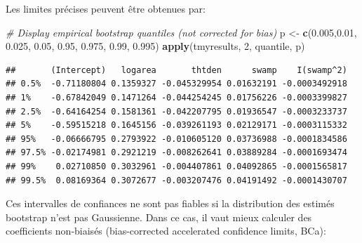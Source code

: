 \documentclass[12pt,]{book}
\newenvironment{Shaded}{\begin{snugshade}}{\end{snugshade}}
\newcommand{\CommentTok}[1]{\textcolor[rgb]{0.56,0.35,0.01}{\textit{#1}}}
\newcommand{\DecValTok}[1]{\textcolor[rgb]{0.00,0.00,0.81}{#1}}
\newcommand{\FloatTok}[1]{\textcolor[rgb]{0.00,0.00,0.81}{#1}}
\newcommand{\KeywordTok}[1]{\textcolor[rgb]{0.13,0.29,0.53}{\textbf{#1}}}
\newcommand{\NormalTok}[1]{#1}
\newcommand{\StringTok}[1]{\textcolor[rgb]{0.31,0.60,0.02}{#1}}
\begin{document}
Les limites précises peuvent être obtenues par:

\begin{Shaded}
\begin{Highlighting}[]
\CommentTok{# Display empirical bootstrap quantiles (not corrected for bias)}
\NormalTok{p <-}\StringTok{ }\KeywordTok{c}\NormalTok{(}\FloatTok{0.005}\NormalTok{,}\FloatTok{0.01}\NormalTok{, }\FloatTok{0.025}\NormalTok{, }\FloatTok{0.05}\NormalTok{, }\FloatTok{0.95}\NormalTok{, }\FloatTok{0.975}\NormalTok{, }\FloatTok{0.99}\NormalTok{, }\FloatTok{0.995}\NormalTok{)}
\KeywordTok{apply}\NormalTok{(tmyresults, }\DecValTok{2}\NormalTok{, quantile, p)}
\end{Highlighting}
\end{Shaded}

\begin{verbatim}
##       (Intercept)   logarea       thtden      swamp    I(swamp^2)
## 0.5%  -0.71180804 0.1359327 -0.045329954 0.01632191 -0.0003492918
## 1%    -0.67842049 0.1471264 -0.044254245 0.01756226 -0.0003399827
## 2.5%  -0.64164254 0.1581361 -0.042207795 0.01936547 -0.0003233737
## 5%    -0.59515218 0.1645156 -0.039261193 0.02129171 -0.0003115332
## 95%   -0.06666795 0.2793922 -0.010605120 0.03736988 -0.0001834586
## 97.5% -0.02174981 0.2921219 -0.008262641 0.03889284 -0.0001693474
## 99%    0.02710850 0.3032961 -0.004407861 0.04092865 -0.0001565817
## 99.5%  0.08169364 0.3072677 -0.003207476 0.04191492 -0.0001430707
\end{verbatim}

Ces intervalles de confiances ne sont pas fiables si la distribution des estimés bootstrap n'est pas Gaussienne. Dans ce cas, il vaut mieux calculer des coefficients non-biaisés (bias-corrected accelerated confidence limits, BCa):
\end{document}
